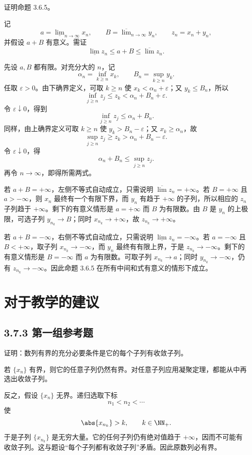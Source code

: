 \begin{xexercise}[3.6.4 练习题 11]
证明命题 3.6.5。
\end{xexercise}
\begin{xsolution}
记
\[
  a=\underline{\lim}_{n\to\infty}x_n,
  \qquad
  B=\overline{\lim}_{n\to\infty}y_n,
  \qquad
  z_n=x_n+y_n,
\]
并假设 $a+B$ 有意义。需证
\[
  \underline{\lim}z_n\leqslant a+B\leqslant\overline{\lim}z_n.
\]

先设 $a,B$ 都有限。对充分大的 $n$，记
\[
  \alpha_n=\inf_{k\geqslant n}x_k,
  \qquad
  B_n=\sup_{k\geqslant n}y_k.
\]
任取 $\varepsilon>0$。由下确界定义，可取 $k\geqslant n$ 使 $x_k<\alpha_n+\varepsilon$；又 $y_k\leqslant B_n$，所以
\[
  \inf_{j\geqslant n}z_j
  \leqslant z_k<\alpha_n+B_n+\varepsilon.
\]
令 $\varepsilon\downarrow0$，得到
\[
  \inf_{j\geqslant n}z_j\leqslant\alpha_n+B_n.
\]
同样，由上确界定义可取 $k\geqslant n$ 使 $y_k>B_n-\varepsilon$；又 $x_k\geqslant\alpha_n$，故
\[
  \sup_{j\geqslant n}z_j
  \geqslant z_k>\alpha_n+B_n-\varepsilon.
\]
令 $\varepsilon\downarrow0$，得
\[
  \alpha_n+B_n\leqslant\sup_{j\geqslant n}z_j.
\]
再令 $n\to\infty$，即得所需两式。

若 $a+B=+\infty$，左侧不等式自动成立，只需说明 $\overline{\lim}z_n=+\infty$。若 $B=+\infty$ 且 $a>-\infty$，则 $x_n$ 最终有一个有限下界，而 $y_n$ 有趋于 $+\infty$ 的子列，所以相应的 $z_n$ 子列趋于 $+\infty$。剩下的有意义情形是 $a=+\infty$ 而 $B$ 为有限数。由 $B$ 是 $y_n$ 的上极限，可选子列 $y_{n_k}\to B$；同时 $x_{n_k}\to+\infty$，故 $z_{n_k}\to+\infty$。

若 $a+B=-\infty$，右侧不等式自动成立，只需说明 $\underline{\lim}z_n=-\infty$。若 $a=-\infty$ 且 $B<+\infty$，取子列 $x_{n_k}\to-\infty$，而 $y_n$ 最终有有限上界，于是 $z_{n_k}\to-\infty$。剩下的有意义情形是 $B=-\infty$ 而 $a$ 为有限数。可取子列 $x_{n_k}\to a$；同时 $y_{n_k}\to-\infty$，仍有 $z_{n_k}\to-\infty$。因此命题 3.6.5 在所有中间和式有意义的情形下成立。
\end{xsolution}

\section{对于教学的建议}
\subsection*{3.7.3 第一组参考题}

\begin{xreferenceproblem}[第一组参考题 1]
证明：数列有界的充分必要条件是它的每个子列有收敛子列。
\end{xreferenceproblem}
\begin{xsolution}
若 $\{x_n\}$ 有界，则它的任意子列仍然有界。对任意子列应用凝聚定理，都能从中再选出收敛子列。

反之，假设 $\{x_n\}$ 无界。递归选取下标
\[
  n_1<n_2<\cdots
\]
使
\[
  \abs{x_{n_k}}>k,\qquad k\in\NN_+.
\]
于是子列 $\{x_{n_k}\}$ 是无穷大量。它的任何子列仍有绝对值趋于 $+\infty$，因而不可能有收敛子列。这与题设“每个子列都有收敛子列”矛盾。因此原数列必有界。
\end{xsolution}

